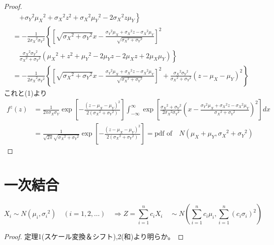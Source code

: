 \begin{proof}
\begin{align*}
                &\quad \left. + {\sigma_Y}^2{\mu_X}^2 + {\sigma_X}^2z^2 + {\sigma_X}^2{\mu_Y}^2 - 2{\sigma_X}^2z\mu_Y \right\}\\
                &= -\frac{1}{{2\sigma_X}^2{\sigma_Y}^2} \left\{{\left[\sqrt{{\sigma_X}^2+{\sigma_Y}^2}x - \frac{{\sigma_Y}^2\mu_X + {\sigma_X}^2z - {\sigma_X}^2\mu_Y}{\sqrt{{\sigma_X}^2+{\sigma_Y}^2}}\right]}^2\right.\\
                &\quad \left. \frac{{\sigma_X}^2{\sigma_Y}^2}{{\sigma_X}^2+{\sigma_Y}^2}({\mu_X}^2 + z^2 + {\mu_Y}^2 - 2\mu_Y z - 2\mu_X z + 2\mu_X\mu_Y) \right\}\\
                &= -\frac{1}{{2\sigma_X}^2{\sigma_Y}^2} \left\{{\left[\sqrt{{\sigma_X}^2+{\sigma_Y}^2}x - \frac{{\sigma_Y}^2\mu_X + {\sigma_X}^2z - {\sigma_X}^2\mu_Y}{\sqrt{{\sigma_X}^2+{\sigma_Y}^2}}\right]}^2 + \frac{{\sigma_X}^2{\sigma_Y}^2}{{\sigma_X}^2+{\sigma_Y}^2}(z-\mu_X-\mu_Y)^2 \right\}
            \end{align*}
            これと(1)より
            \begin{align*}
                f^z(z) &= \frac{1}{2\pi\sigma_X\sigma_Y}\exp{\left[-\frac{(z-\mu_X-\mu_Y)^2}{2({\sigma_X}^2+{\sigma_Y}^2)}\right]}\int_{-\infty}^{\infty}{\exp{\left[\frac{{\sigma_X}^2+{\sigma_Y}^2}{2{\sigma_X}^2{\sigma_Y}^2}\left(x-\frac{{\sigma_Y}^2\mu_X + {\sigma_X}^2z - {\sigma_X}^2\mu_Y}{{\sigma_X}^2+{\sigma_Y}^2}\right)^2\right]} dx}\\
                &= \frac{1}{\sqrt{2\pi}\sqrt{{\sigma_X}^2+{\sigma_Y}^2}}\exp{\left[-\frac{(z-\mu_X-\mu_Y)^2}{2({\sigma_X}^2+{\sigma_Y}^2)}\right]} = \text{pdf of} \quad N(\mu_X+\mu_Y,{\sigma_X}^2+{\sigma_Y}^2)
            \end{align*}
        \end{proof}
    \section{一次結合}
        \begin{shadebox}
            \[X_i \sim N(\mu_i,{\sigma_i}^2) \quad (i=1,2,\dotsc) \quad \Rightarrow Z = \sum_{i=1}^{n}{c_i X_i} \quad \sim N\left(\sum_{i=1}^{n}{c_i \mu_i},\sum_{i=1}^{n}{(c_i \sigma_i)^2}\right)\]
        \end{shadebox}
        \begin{proof}
            \quad\par
            定理1(スケール変換＆シフト),2(和)より明らか。
        \end{proof}
